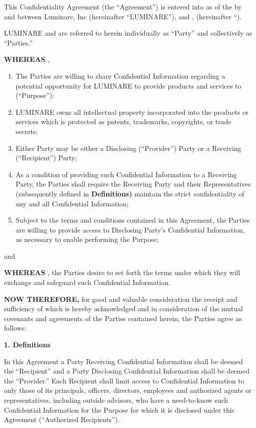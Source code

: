\documentclass[11pt,a4paper]{article} %
\begin{document}
This Confidentiality Agreement (the ``Agreement'') is entered into as of
the   by and between Luminare, Inc (hereinafter
``LUMINARE''), and  , (hereinafter
``).

LUMINARE and  are referred to herein individually as
``Party'' and collectively as ``Parties.''

\textbf{WHEREAS} ,

\begin{enumerate}
\def\labelenumi{(\alph{enumi})}
\item
  The Parties are willing to share Confidential Information regarding a
  potential opportunity for LUMINARE to provide products and services to
   (``Purpose''):
\item
  LUMINARE owns all intellectual property incorporated into the products
  or services which is protected as patents, trademarks, copyrights, or
  trade secrets;
\item
  Either Party may be either a Disclosing (``Provider'') Party or a
  Receiving (``Recipient'') Party;
\item
  As a condition of providing such Confidential Information to a
  Receiving Party, the Parties shall require the Receiving Party and
  their Representatives (subsequently defined in \textbf{Definitions)}
  maintain the strict confidentiality of any and all Confidential
  Information;
\item
  Subject to the terms and conditions contained in this Agreement, the
  Parties are willing to provide access to Disclosing Party's
  Confidential Information, as necessary to enable performing the
  Purpose;
\end{enumerate}

and

\textbf{WHEREAS} , the Parties desire to set forth the terms under which
they will exchange and safeguard such Confidential Information.

\textbf{NOW THEREFORE,} for good and valuable consideration the receipt
and sufficiency of which is hereby acknowledged and in consideration of
the mutual covenants and agreements of the Parties contained herein, the
Parties agree as follows:

\textbf{1. Definitions}

In this Agreement a Party Receiving Confidential Information shall be
deemed the ``Recipient'' and a Party Disclosing Confidential Information
shall be deemed the ``Provider.'' Each Recipient shall limit access to
Confidential Information to only those of its principals, officers,
directors, employees and authorized agents or representatives, including
outside advisors, who have a need-to-know such Confidential Information
for the Purpose for which it is disclosed under this Agreement
(``Authorized Recipients'').
\end{document}
